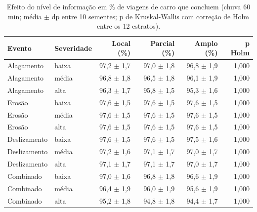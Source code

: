 \begin{table}[htbp]
\centering
\scriptsize
\caption{Efeito do nível de informação em \% de viagens de carro que concluem (chuva 60 min; média $\pm$ dp entre 10 sementes; p de Kruskal-Wallis com correção de Holm entre os 12 estratos).}
\label{tab:t2_carro}
\begin{tabular}{llrrrr}
\toprule
Evento & Severidade & Local (\%) & Parcial (\%) & Amplo (\%) & p Holm \\
\midrule
Alagamento & baixa & 97,2 $\pm$ 1,7 & 97,0 $\pm$ 1,8 & 96,8 $\pm$ 1,9 & 1,000 \\
Alagamento & média & 96,8 $\pm$ 1,8 & 96,5 $\pm$ 1,8 & 96,1 $\pm$ 1,9 & 1,000 \\
Alagamento & alta & 96,3 $\pm$ 1,7 & 95,8 $\pm$ 1,5 & 95,3 $\pm$ 1,6 & 1,000 \\
Erosão & baixa & 97,6 $\pm$ 1,5 & 97,6 $\pm$ 1,5 & 97,6 $\pm$ 1,5 & 1,000 \\
Erosão & média & 97,6 $\pm$ 1,5 & 97,6 $\pm$ 1,5 & 97,6 $\pm$ 1,5 & 1,000 \\
Erosão & alta & 97,6 $\pm$ 1,5 & 97,6 $\pm$ 1,5 & 97,6 $\pm$ 1,5 & 1,000 \\
Deslizamento & baixa & 97,6 $\pm$ 1,5 & 97,6 $\pm$ 1,5 & 97,5 $\pm$ 1,6 & 1,000 \\
Deslizamento & média & 97,2 $\pm$ 1,6 & 97,1 $\pm$ 1,7 & 97,0 $\pm$ 1,7 & 1,000 \\
Deslizamento & alta & 97,1 $\pm$ 1,7 & 97,1 $\pm$ 1,7 & 97,0 $\pm$ 1,7 & 1,000 \\
Combinado & baixa & 97,0 $\pm$ 1,6 & 96,8 $\pm$ 1,8 & 96,6 $\pm$ 1,9 & 1,000 \\
Combinado & média & 96,4 $\pm$ 1,9 & 96,0 $\pm$ 1,9 & 95,6 $\pm$ 1,9 & 1,000 \\
Combinado & alta & 95,2 $\pm$ 1,8 & 94,8 $\pm$ 1,8 & 94,4 $\pm$ 1,7 & 1,000 \\
\bottomrule
\end{tabular}
\end{table}
